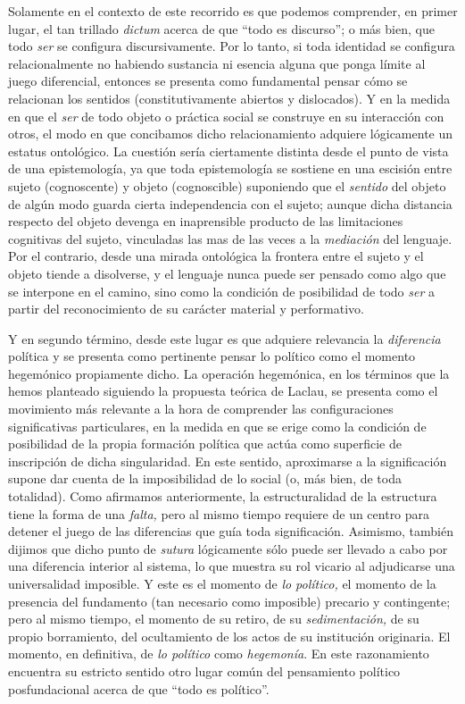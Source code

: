 Solamente en el contexto de este recorrido es que podemos comprender, en primer lugar, el tan trillado \emph{dictum} acerca de que \enquote{todo es discurso}; o más bien, que todo \emph{ser} se configura discursivamente. Por lo tanto, si toda identidad se configura relacionalmente no habiendo sustancia ni esencia alguna que ponga límite al juego diferencial, entonces se presenta como fundamental pensar cómo se relacionan los sentidos (constitutivamente abiertos y dislocados). Y en la medida en que el \emph{ser} de todo objeto o práctica social se construye en su interacción con otros, el modo en que concibamos dicho relacionamiento adquiere lógicamente un estatus ontológico. La cuestión sería ciertamente distinta desde el punto de vista de una epistemología, ya que toda epistemología se sostiene en una escisión entre sujeto (cognoscente) y objeto (cognoscible) suponiendo que el \emph{sentido} del objeto de algún modo guarda cierta independencia con el sujeto; aunque dicha distancia respecto del objeto devenga en inaprensible producto de las limitaciones cognitivas del sujeto, vinculadas las mas de las veces a la \emph{mediación} del lenguaje. Por el contrario, desde una mirada ontológica la frontera entre el sujeto y el objeto tiende a disolverse, y el lenguaje nunca puede ser pensado como algo que se interpone en el camino, sino como la condición de posibilidad de todo \emph{ser} a partir del reconocimiento de su carácter material y performativo.

Y en segundo término, desde este lugar es que adquiere relevancia la \emph{diferencia} política y se presenta como pertinente pensar lo político como el momento hegemónico propiamente dicho. La operación hegemónica, en los términos que la hemos planteado siguiendo la propuesta teórica de Laclau, se presenta como el movimiento más relevante a la hora de comprender las configuraciones significativas particulares, en la medida en que se erige como la condición de posibilidad de la propia formación política que actúa como superficie de inscripción de dicha singularidad. En este sentido, aproximarse a la significación supone dar cuenta de la imposibilidad de lo social (o, más bien, de toda totalidad). Como afirmamos anteriormente, la estructuralidad de la estructura tiene la forma de una \emph{falta,} pero al mismo tiempo requiere de un centro para detener el juego de las diferencias que guía toda significación. Asimismo, también dijimos que dicho punto de \emph{sutura} lógicamente sólo puede ser llevado a cabo por una diferencia interior al sistema, lo que muestra su rol vicario al adjudicarse una universalidad imposible. Y este es el momento de \emph{lo político,} el momento de la presencia del fundamento (tan necesario como imposible) precario y contingente; pero al mismo tiempo, el momento de su retiro, de su \emph{sedimentación,} de su propio borramiento, del ocultamiento de los actos de su institución originaria. El momento, en definitiva, de \emph{lo político} como \emph{hegemonía}. En este razonamiento encuentra su estricto sentido otro lugar común del pensamiento político posfundacional acerca de que \enquote{todo es político}.

